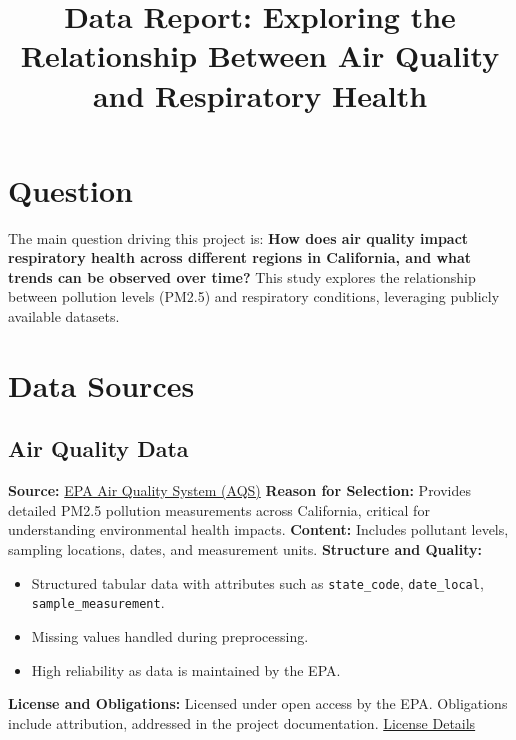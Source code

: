 \documentclass[a4paper,12pt]{article}
\title{Data Report: Exploring the Relationship Between Air Quality and Respiratory Health}
\author{}
\date{}
\begin{document}
\maketitle

\section*{Question}
The main question driving this project is:  
\textbf{How does air quality impact respiratory health across different regions in California, and what trends can be observed over time?}  
This study explores the relationship between pollution levels (PM2.5) and respiratory conditions, leveraging publicly available datasets.

\section*{Data Sources}

\subsection*{Air Quality Data}
\textbf{Source:} \href{https://aqs.epa.gov/data/}{EPA Air Quality System (AQS)}  
\textbf{Reason for Selection:} Provides detailed PM2.5 pollution measurements across California, critical for understanding environmental health impacts.  
\textbf{Content:} Includes pollutant levels, sampling locations, dates, and measurement units.  
\textbf{Structure and Quality:}
\begin{itemize}
    \item Structured tabular data with attributes such as \texttt{state\_code}, \texttt{date\_local}, \texttt{sample\_measurement}.
    \item Missing values handled during preprocessing.
    \item High reliability as data is maintained by the EPA.
\end{itemize}
\textbf{License and Obligations:}  
Licensed under open access by the EPA. Obligations include attribution, addressed in the project documentation.  
\href{https://www.epa.gov/airdata}{License Details}
\end{document}

